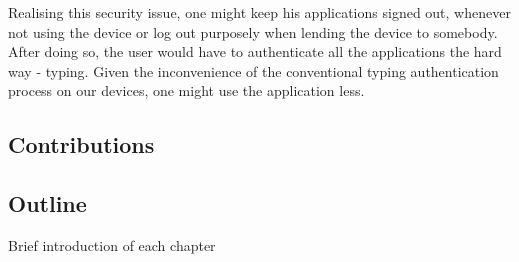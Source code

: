 Realising this security issue, one might keep his applications signed out, whenever not using the device or log out purposely when lending the device to somebody. After doing so, the user would have to authenticate all the applications the hard way - typing. Given the inconvenience of the conventional typing authentication process on our devices, one might use the application less.


\subsection{Contributions}





\subsection{Outline}


Brief introduction of each chapter %


